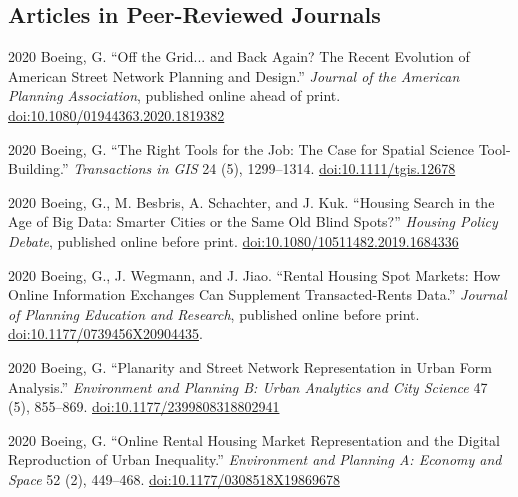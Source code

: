 \documentclass[12pt,letterpaper]{report}
\begin{document}
    \subsection*{Articles in Peer-Reviewed Journals}

    \begin{tablist}

        \item[2020] \tab Boeing, G. \enquote{Off the Grid... and Back Again? The Recent Evolution of American Street Network Planning and Design.} \textit{Journal of the American Planning Association}, published online ahead of print. \href{https://doi.org/10.1080/01944363.2020.1819382}{doi:10.1080/01944363.2020.1819382}

        \item[2020] \tab Boeing, G. \enquote{The Right Tools for the Job: The Case for Spatial Science Tool-Building.} \textit{Transactions in GIS} 24 (5), 1299--1314. \href{https://doi.org/10.1111/tgis.12678}{doi:10.1111/tgis.12678}

        \item[2020] \tab Boeing, G., M. Besbris, A. Schachter, and J. Kuk. \enquote{Housing Search in the Age of Big Data: Smarter Cities or the Same Old Blind Spots?} \textit{Housing Policy Debate}, published online before print. \href{https://doi.org/10.1080/10511482.2019.1684336}{doi:10.1080/10511482.2019.1684336}

        \item[2020] \tab Boeing, G., J. Wegmann, and J. Jiao. \enquote{Rental Housing Spot Markets: How Online Information Exchanges Can Supplement Transacted-Rents Data.} \textit{Journal of Planning Education and Research}, published online before print. \href{https://doi.org/10.1177/0739456X20904435}{doi:10.1177/0739456X20904435}.

        \item[2020] \tab Boeing, G. \enquote{Planarity and Street Network Representation in Urban Form Analysis.} \textit{Environment and Planning B: Urban Analytics and City Science} 47 (5), 855--869. \href{https://doi.org/10.1177/2399808318802941}{doi:10.1177/2399808318802941}

        \item[2020] \tab Boeing, G. \enquote{Online Rental Housing Market Representation and the Digital Reproduction of Urban Inequality.} \textit{Environment and Planning A: Economy and Space} 52 (2), 449--468. \href{https://doi.org/10.1177/0308518X19869678}{doi:10.1177/0308518X19869678}


\end{tablist}
\end{document}
